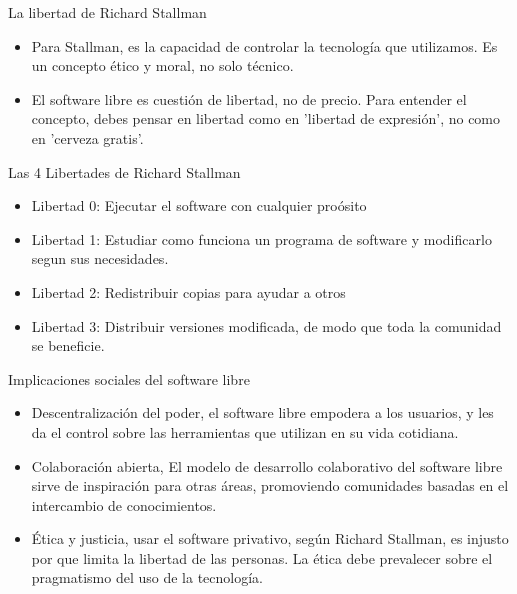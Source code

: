 \documentclass{beamer}
\begin{document}
\begin{frame}{La libertad de Richard Stallman}
  \begin{itemize}
    \item Para Stallman, es la capacidad de controlar la tecnología que utilizamos. Es un concepto ético y moral, no solo técnico. \pause
  \item El software libre es cuestión de libertad, no de precio. Para entender
    el concepto, debes pensar en libertad como en 'libertad de expresión', no
    como en 'cerveza gratis'.
  \end{itemize}
\end{frame}

\begin{frame}{Las 4 Libertades de Richard Stallman}
  \begin{itemize}
    \item Libertad 0: Ejecutar el software con cualquier proósito \pause
    \item Libertad 1: Estudiar como funciona un programa de software y
      modificarlo segun sus necesidades. \pause
    \item Libertad 2: Redistribuir copias para ayudar a otros \pause
    \item Libertad 3: Distribuir versiones modificada, de modo que toda la
      comunidad se beneficie.
  \end{itemize}
\end{frame}

\begin{frame}{Implicaciones sociales del software libre}
\begin{itemize}
  \item Descentralización del poder, el software libre empodera a los usuarios,
    y les da el control sobre las herramientas que utilizan en su vida
    cotidiana. \pause
  \item Colaboración abierta, El modelo de desarrollo colaborativo del software
    libre sirve de inspiración para otras áreas, promoviendo comunidades basadas
    en el intercambio de conocimientos. \pause
  \item Ética y justicia, usar el software privativo, según Richard Stallman, es
    injusto por que limita la libertad de las personas. La ética debe prevalecer
    sobre el pragmatismo del uso de la tecnología.
\end{itemize}
\end{frame}
\end{document}
